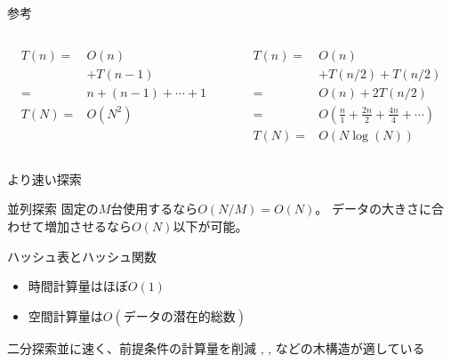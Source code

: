 \documentclass{beamer}
\begin{document}
\begin{frame}[fragile]{参考}{}

\begin{columns}[T]
\begin{column}{0.5\textwidth}
\begin{align*}
T(n) = & O(n) \\
& + T(n-1)\\
= & n + (n - 1) + \cdots + 1 \\
T(N) = & O(N^2)
\end{align*}
\end{column}

\begin{column}{0.5\textwidth}
\begin{align*}
T(n) = & O(n) \\
& + T(n/2) + T(n/2)\\
= & O(n) + 2T(n/2) \\
= & O\left(\frac{n}{1} + \frac{2n}{2} + \frac{4n}{4} + \cdots \right) \\
T(N) = & O(N\log(N))
\end{align*}
\end{column}
\end{columns}

\end{frame}

\begin{frame}[fragile]{より速い探索}{}
\begin{block}{並列探索}
固定の$M$台使用するなら$O(N/M) = O(N)$。
データの大きさに合わせて増加させるなら$O(N)$以下が可能。
\end{block}

\begin{block}{ハッシュ表とハッシュ関数}
\begin{itemize}%
\item 時間計算量はほぼ$O(1)$
\item 空間計算量は$O(データの潜在的総数)$\footnotemark
\end{itemize}
\end{block}

\begin{block}{二分探索並に速く、前提条件の計算量を削減}
\href{https://ja.wikipedia.org/wiki/赤黒木}{},
\href{https://ja.wikipedia.org/wiki/トライ_(データ構造)}{},
\href{https://ja.wikipedia.org/wiki/2-3-4木}{}などの木構造が適している
\end{block}

\end{frame}
\end{document}
